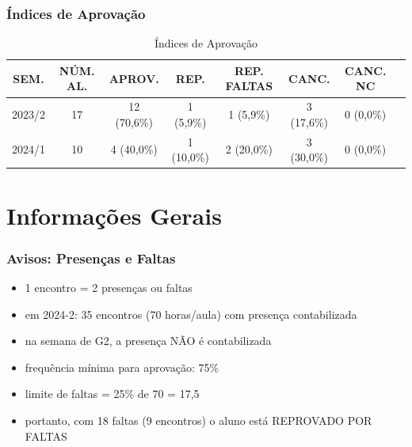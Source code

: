 \documentclass[aspectratio=169]{beamer}
\begin{document}

\begin{frame}\frametitle{\'Indices de Aprova\c{c}\~ao}
	\begin{table}
		\centering
		\begin{tabular}{cccccccc}
			\toprule
			SEM. & N\'UM. AL. & APROV. & REP. & REP. FALTAS & CANC. & CANC. NC\\
			\midrule
			2023/2 & 17 & 12 (70,6\%) & 1 (5,9\%) & 1 (5,9\%) & 3 (17,6\%)& 0 (0,0\%)\\
			2024/1 & 10 & 4 (40,0\%) & 1 (10,0\%) & 2 (20,0\%) & 3 (30,0\%)& 0 (0,0\%)\\
			\bottomrule
		\end{tabular}
		\caption{\'Indices de Aprova\c{c}\~ao}
	\end{table}
\end{frame}

\section{Informa\c{c}\~oes Gerais}

\begin{frame}\frametitle{Avisos: Presenças e Faltas}
\begin{itemize}
	\item 1 encontro = 2 presen\c{c}as ou faltas
	\item em 2024-2: 35 encontros (70 horas/aula) com presença contabilizada
	\item na semana de G2, a presença NÃO é contabilizada
	\item frequ\^encia m\'inima para aprova\c{c}\~ao: 75\%
	\item limite de faltas = 25\% de 70 = 17,5
	\item portanto, com 18 faltas (9 encontros) o aluno está REPROVADO POR FALTAS
\end{itemize}
\end{frame}
\end{document}

